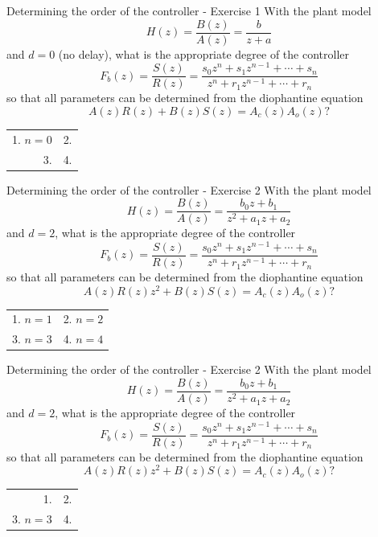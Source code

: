 \documentclass[presentation,aspectratio=169]{beamer}
\begin{document}
\begin{frame}[label={sec:orga998746}]{Determining the order of the controller - Exercise 1}
With the plant model \[H(z) = \frac{B(z)}{A(z)} = \frac{b}{z + a}\] and \(d=0\) (no delay), what is the appropriate degree of the controller \[F_b(z) = \frac{S(z)}{R(z)} = \frac{s_0z^n + s_1z^{n-1} + \cdots + s_n}{z^n + r_1 z^{n-1} + \cdots + r_n}\]
so that all parameters can be determined from the diophantine equation
\[ A(z)R(z) + B(z)S(z) = A_c(z)A_o(z)?\]
\begin{center}
\begin{tabular}{rr}
1. \(n = 0\) & 2.\\
3. & 4.\\
\end{tabular}
\end{center}
\end{frame}

\begin{frame}[label={sec:org9492b58}]{Determining the order of the controller - Exercise 2}
With the plant model \[H(z) = \frac{B(z)}{A(z)} = \frac{b_0z + b_1}{z^2 + a_1z + a_2}\] and \(d=2\), what is the appropriate degree of the controller \[F_b(z) = \frac{S(z)}{R(z)} = \frac{s_0z^n + s_1z^{n-1} + \cdots + s_n}{z^n + r_1 z^{n-1} + \cdots + r_n}\]
so that all parameters can be determined from the diophantine equation
\[ A(z)R(z)z^2 + B(z)S(z) = A_c(z)A_o(z)?\]
\begin{center}
\begin{tabular}{ll}
1. \(n = 1\) & 2. \(n = 2\)\\
3. \(n=3\) & 4. \(n=4\)\\
\end{tabular}
\end{center}
\end{frame}

\begin{frame}[label={sec:orgd64b1c6}]{Determining the order of the controller - Exercise 2}
With the plant model \[H(z) = \frac{B(z)}{A(z)} = \frac{b_0z + b_1}{z^2 + a_1z + a_2}\] and \(d=2\), what is the appropriate degree of the controller \[F_b(z) = \frac{S(z)}{R(z)} = \frac{s_0z^n + s_1z^{n-1} + \cdots + s_n}{z^n + r_1 z^{n-1} + \cdots + r_n}\]
so that all parameters can be determined from the diophantine equation
\[ A(z)R(z)z^2 + B(z)S(z) = A_c(z)A_o(z)?\]
\begin{center}
\begin{tabular}{rr}
1. & 2.\\
3. \(n=3\) & 4.\\
\end{tabular}
\end{center}
\end{frame}
\end{document}
